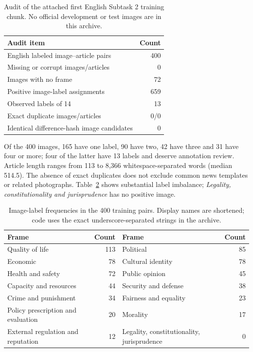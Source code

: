 \documentclass[11pt]{article}
\begin{document}
\begin{table}[ht]
\centering
\begin{tabular}{lr}\toprule
Audit item & Count\\\midrule
English labeled image--article pairs & 400\\
Missing or corrupt images/articles & 0\\
Images with no frame & 72\\
Positive image-label assignments & 659\\
Observed labels of 14 & 13\\
Exact duplicate images/articles & 0/0\\
Identical difference-hash image candidates & 0\\\bottomrule
\end{tabular}
\caption{Audit of the attached first English Subtask 2 training chunk. No official development or test images are in this archive.}\label{tab:audit}
\end{table}

Of the 400 images, 165 have one label, 90 have two, 42 have three and 31 have four or more; four of the latter have 13 labels and deserve annotation review. Article length ranges from 113 to 8,366 whitespace-separated words (median 514.5). The absence of exact duplicates does not exclude common news templates or related photographs. Table~\ref{tab:labels} shows substantial label imbalance; \emph{Legality, constitutionality and jurisprudence} has no positive image.

\begin{table}[ht]
\centering\footnotesize
\begin{tabular}{lr@{\hspace{0.3in}}lr}\toprule
Frame & Count & Frame & Count\\\midrule
Quality of life & 113 & Political & 85\\
Economic & 78 & Cultural identity & 78\\
Health and safety & 72 & Public opinion & 45\\
Capacity and resources & 44 & Security and defense & 38\\
Crime and punishment & 34 & Fairness and equality & 23\\
Policy prescription and evaluation & 20 & Morality & 17\\
External regulation and reputation & 12 & Legality, constitutionality, jurisprudence & 0\\\bottomrule
\end{tabular}
\caption{Image-label frequencies in the 400 training pairs. Display names are shortened; code uses the exact underscore-separated strings in the archive.}\label{tab:labels}
\end{table}
\end{document}
